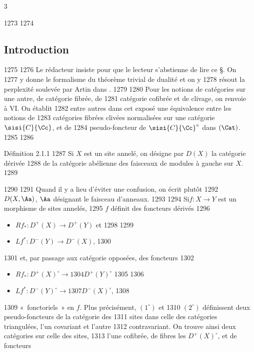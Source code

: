 3	\documentclass[10pt]{../fichiers-configuration-latex/smfart}
\begin{document}
  1273	
  1274	\subsection{Introduction}
  1275	
  1276	Le rédacteur insiste pour que le lecteur s'abstienne de lire ce \S. On
  1277	y donne le formalisme du théorème trivial de dualité et on y
  1278	résout la perplexité soulevée par Artin dans .
  1279	
  1280	Pour les notions de catégories sur une autre, de catégorie fibrée, de
  1281	catégorie cofibrée et de clivage, on renvoie à  VI. On établit
  1282	entre autres dans cet exposé une équivalence entre les notions de
  1283	catégories fibrées clivées normalisées sur une catégorie $\sisi{C}{\Cc}$, et de
  1284	pseudo-foncteur de $\sisi{C}{\Cc}^{\circ}$ dans $(\Cat)$.
  1285	
  1286	\begin{enonce*}{Définition 2.1.1}
  1287	Si $X$ est un site annelé, on désigne par $D(X)$ la catégorie dérivée
  1288	de la catégorie abélienne des faisceaux de modules à gauche sur $X$.
  1289	\end{enonce*}
  1290	
  1291	Quand il y a lieu d'éviter une confusion, on écrit plutôt
  1292	$D(X,\Aa)$, $\Aa$ désignant le faisceau d'anneaux.
  1293	
  1294	Si\pageoriginale $f:X\rightarrow Y$ est un morphisme de sites annelés,
  1295	$f$ définit des foncteurs dérivés
  1296	\begin{itemize}
  1297	\item[(1)] $Rf_{\ast}:D^{+}(X)\rightarrow D^{+}(Y)$ et
  1298	
  1299	\item[(2)] $Lf^{\ast}:D^{-}(Y)\rightarrow D^{-}(X)$,
  1300	\end{itemize}
  1301	et, par passage aux catégorie opposées, des foncteurs
  1302	\begin{itemize}
  1303	\item[$\rm(1^{\circ})$] $Rf_{\ast}:D^{+}(X)^{\circ}\rightarrow
  1304	D^{+}(Y)^{\circ}$
  1305	
  1306	\item[$\rm(2^{\circ})$] $Lf^{\ast}:D^{-}(Y)^{\circ}\rightarrow
  1307	D^{-}(X)^{\circ}$,
  1308	\end{itemize}
  1309	« fonctoriels »  en $f$. Plus précisément, $(1^{\circ})$ et
  1310	$(2^{\circ})$ définissent deux pseudo-foncteurs de la catégorie des
  1311	sites dans celle des catégories triangulées, l'un covariant et l'autre
  1312	contravariant. On trouve ainsi deux catégories sur celle des sites,
  1313	l'une cofibrée, de fibres les $D^{+}(X)^{\circ}$, et de foncteurs
\end{document}
